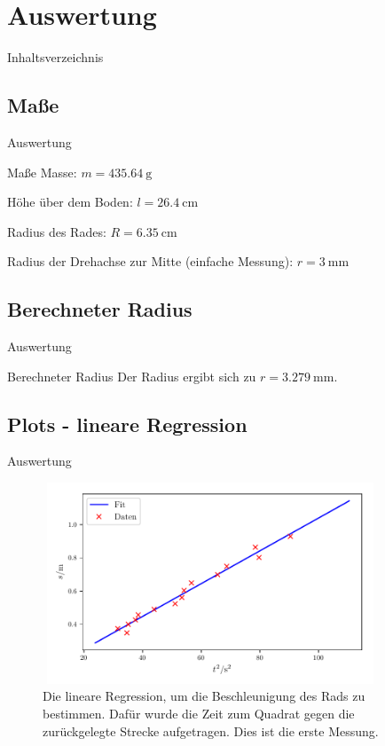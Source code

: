 \section{Auswertung}

\begin{frame}{Inhaltsverzeichnis}
\end{frame} 

\subsection{Maße}

\begin{frame}[t]{Auswertung}
    \begin{block}{Maße}
    Masse: $m = \SI{435.64}{\gram}$

    Höhe über dem Boden: $l= \SI{26.4}{\centi\meter}$
    
    Radius des Rades: $R =\SI{6.35}{\centi\meter}$
    
    Radius der Drehachse zur Mitte (einfache Messung): $r= \SI{3}{\milli\meter}$
    \end{block}
\end{frame}
\subsection{Berechneter Radius}
\begin{frame}[t]{Auswertung}

    \begin{block}{Berechneter Radius}
        Der Radius ergibt sich zu $r= \SI{3.279}{\milli\meter}$. 
    \end{block}
\end{frame}

\subsection{Plots - lineare Regression}

\begin{frame}{Auswertung}
    \begin{figure}   
    
    \centering
    \includegraphics[width=10cm, height=6cm]{build/plot1b.pdf}
    \caption{Die lineare Regression, um die Beschleunigung des Rads zu bestimmen. Dafür wurde die Zeit zum Quadrat gegen die zurückgelegte Strecke aufgetragen. Dies ist die erste Messung.} 

    \label{fig:plot1b}
\end{figure}
\end{frame}

